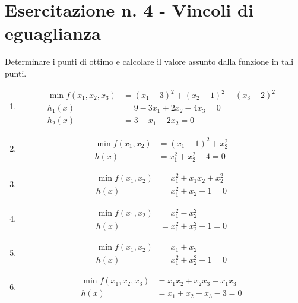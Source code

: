 \documentclass[italian,12pt]{article}
\begin{document}
\pagestyle{empty}

\section*{Esercitazione n. 4 - Vincoli di eguaglianza}

Determinare i punti di ottimo e calcolare il valore assunto dalla funzione in tali punti.

\begin{enumerate}[1)]
	\item %
		\begin{minipage}[c]{0.8\textwidth}%
			\begin{align*}
				\min f(x_{1},x_{2},x_{3}) & =(x_{1}-3)^{2}+(x_{2}+1)^{2}+(x_{3}-2)^{2}\\
					h_{1}(x) & =9-3x_{1}+2x_{2}-4x_{3}=0\\
					h_{2}(x) & =3-x_{1}-2x_{2}=0\end{align*}
			\end{minipage}
			
		\item %
		\begin{minipage}[c]{0.8\textwidth}%
			\begin{align*}
				\min f(x_{1},x_{2}) & =(x_{1}-1)^{2}+x_{2}^{2}\\
					h(x) & =x_{1}^2+x_{2}^2-4=0\end{align*}
			\end{minipage}
			
		\item %
		\begin{minipage}[c]{0.8\textwidth}%
			\begin{align*}
				\min f(x_{1},x_{2}) & =x_{1}^{2}+x_1 x_2+x_{2}^{2}\\
					h(x) & =x_{1}^2+x_{2}-1=0\end{align*}
			\end{minipage}
			
		\item %
		\begin{minipage}[c]{0.8\textwidth}%
			\begin{align*}
				\min f(x_{1},x_{2}) & =x_{1}^{2}-x_{2}^{2}\\
					h(x) & =x_{1}^2+x_{2}^2-1=0\end{align*}
			\end{minipage}
		
		\item %
			\begin{minipage}[c]{0.8\textwidth}%
			\begin{align*}
				\min f(x_{1},x_{2}) & =x_{1}+x_{2}\\
					h(x) & =x_{1}^2+x_{2}^2-1=0\end{align*}
			\end{minipage}
			
		\item %
			\begin{minipage}[c]{0.8\textwidth}%
			\begin{align*}
				\min f(x_{1},x_{2},x_{3}) & =x_{1} x_{2} + x_{2} x_{3} + x_{1} x_{3}\\
					h(x) & =x_{1}+x_{2}+x_{3}-3=0\end{align*}
			\end{minipage}
\end{enumerate}
\end{document}
